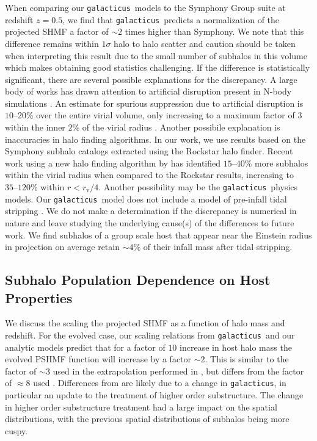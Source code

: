 \documentclass[%
 reprint,
 amsmath,
 amssymb,
 aps,
prd,
twocolumn,
superscriptaddress,
preprintnumbers,
floatfix,
nofootinbib
]{revtex4-2}
\def\gal{{\tt galacticus}~}
\def\galns{{\tt galacticus}}
\def\symphony{Symphony }
\begin{document}
When comparing our \gal models to the Symphony Group suite at redshift $z = 0.5$, we find that \gal predicts a normalization of the projected SHMF a factor of $\sim 2$ times higher than Symphony.
We note that this difference remains within $1 \sigma$ halo to halo scatter and caution should be taken when interpreting this result due to the small number of subhalos in this volume which makes obtaining good statistics challenging.
If the difference is statistically significant, there are several possible explanations for the discrepancy.
A large body of works has drawn attention to artificial disruption present in N-body simulations \citep{10.1093/mnras/stx2956,2022MNRAS.517.1398B,10.1093/mnras/stz2767,10.1093/mnras/stz3349}.
An estimate for spurious suppression due to artificial disruption is $10\text{--}20\%$ over the entire virial volume, only increasing to a maximum factor of $3$ within the inner $2 \%$ of the virial radius \citep{2022MNRAS.517.1398B}.
Another possibile explanation is inaccuracies in halo finding algorithms.
In our work, we use results based on the \symphony subhalo catalogs extracted using the Rockstar \citep{behroozi2012rockstar} halo finder.
Recent work using a new halo finding algorithm by \citet{mansfield2024symfind} has identified $15\text{--}40 \%$ more subhalos within the virial radius when compared to the Rockstar results, increasing to $35\text{--}120\%$ within $r < r_{\mathrm{v}} / 4$.
Another possibility may be the \gal physics models.
Our \gal model does not include a model of pre-infall tidal stripping \citep{behroozi2014mergers}.
We do not make a determination if the discrepancy is numerical in nature and leave studying the underlying cause(s) of the differences to future work.
We find subhalos of a group scale host that appear near the Einstein radius in projection on average retain $\sim 4\%$ of their infall mass after tidal stripping. 


\subsection{Subhalo Population Dependence on Host Properties}
We discuss the scaling the projected SHMF as a function of halo mass and redshift.
For the evolved case, our scaling relations from \gal and our analytic models predict that for a factor of $10$ increase in host halo mass the evolved PSHMF function will increase by a factor $\sim 2$.
This is similar to the factor of $\sim 3$ used in the extrapolation performed in \citet{10.1093/mnras/stu2673}, but differs from the factor of $\approx 8$ used \citet{10.1093/mnras/stz3480}.
Differences from \citet{10.1093/mnras/stz3480} are likely due to a change in \galns, in particular an update to the treatment of higher order substructure.
The change in higher order substructure treatment had a large impact on the spatial distributions, with the previous spatial distributions of subhalos being more cuspy. 
\end{document}
